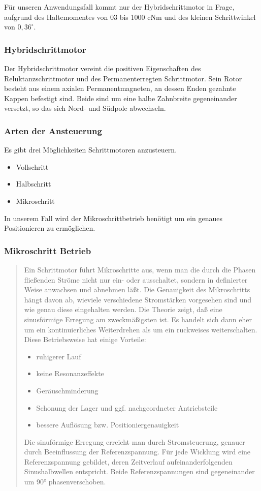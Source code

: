 Für unseren Anwendungsfall kommt nur der Hybridschrittmotor in Frage, aufgrund des Haltemomentes von 03 bis 1000 cNm und des kleinen Schrittwinkel von $0,36^\circ$.

\subsubsection*{Hybridschrittmotor}
Der Hybridschrittmotor vereint die positiven Eigenschaften des Reluktanzschrittmotor und des Permanenterregten Schrittmotor. Sein Rotor besteht aus einem axialen Permanentmagneten, an dessen Enden gezahnte Kappen befestigt sind. Beide sind um eine halbe Zahnbreite gegeneinander versetzt, so das sich Nord- und Südpole abwechseln.

\subsubsection{Arten der Ansteuerung}
Es gibt drei Möglichkeiten Schrittmotoren anzusteuern.
\begin{itemize}
	\item Vollschritt
	\item Halbschritt
	\item Mikroschritt
\end{itemize}

In unserem Fall wird der Mikroschrittbetrieb benötigt um ein genaues Positionieren zu ermöglichen.
\subsubsection*{Mikroschritt Betrieb}

\begin{quote}

Ein Schrittmotor führt Mikroschritte aus, wenn man die durch die Phasen fließenden Ströme nicht nur ein- oder ausschaltet, sondern in definierter Weise anwachsen und abnehmen läßt. Die Genauigkeit des Mikroschritts hängt davon ab, wieviele verschiedene Stromstärken vorgesehen sind und wie genau diese eingehalten werden. Die Theorie zeigt, daß eine sinusförmige Erregung am zweckmäßigsten ist. Es handelt sich dann eher um ein kontinuierliches Weiterdrehen als um ein ruckweises weiterschalten. Diese Betriebsweise hat einige Vorteile:
\begin{itemize}
	\item ruhigerer Lauf
	\item keine Resonanzeffekte
	\item Geräuschminderung
	\item Schonung der Lager und ggf. nachgeordneter Antriebsteile
	\item bessere Auflösung bzw. Positioniergenauigkeit
\end{itemize}

Die sinuförmige Erregung erreicht man durch Stromsteuerung, genauer durch Beeinflussung der Referenzspannung. Für jede Wicklung wird eine Referenzspannung gebildet, deren Zeitverlauf aufeinanderfolgenden Sinushalbwellen  entspricht. Beide Referenzspannungen sind gegeneinander um 90° phasenverschoben.

\end{quote}

\newpage
